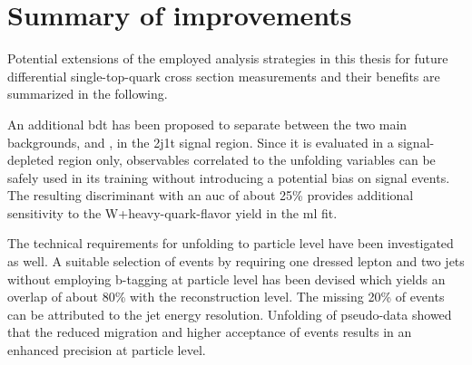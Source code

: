 {\hspace{0.02\textwidth}
}


\section{Summary of improvements}

Potential extensions of the employed analysis strategies in this thesis for future differential single-top-quark cross section measurements and their benefits are summarized in the following.

An additional \gls{bdt} has been proposed to separate between the two main backgrounds, \wjets and \ttbar, in the 2j1t signal region. Since it is evaluated in a signal-depleted region only, observables correlated to the unfolding variables can be safely used in its training without introducing a potential bias on signal events. The resulting discriminant with an \gls{auc} of about 25\% provides additional sensitivity to the W+heavy-quark-flavor yield in the \gls{ml} fit.

The technical requirements for unfolding to particle level have been investigated as well. A suitable selection of events by requiring one dressed lepton and two jets without employing b-tagging at particle level has been devised which yields an overlap of about 80\% with the reconstruction level. The missing 20\% of events can be attributed to the jet energy resolution. Unfolding of pseudo-data showed that the reduced migration and higher acceptance of events results in an enhanced precision at particle level.